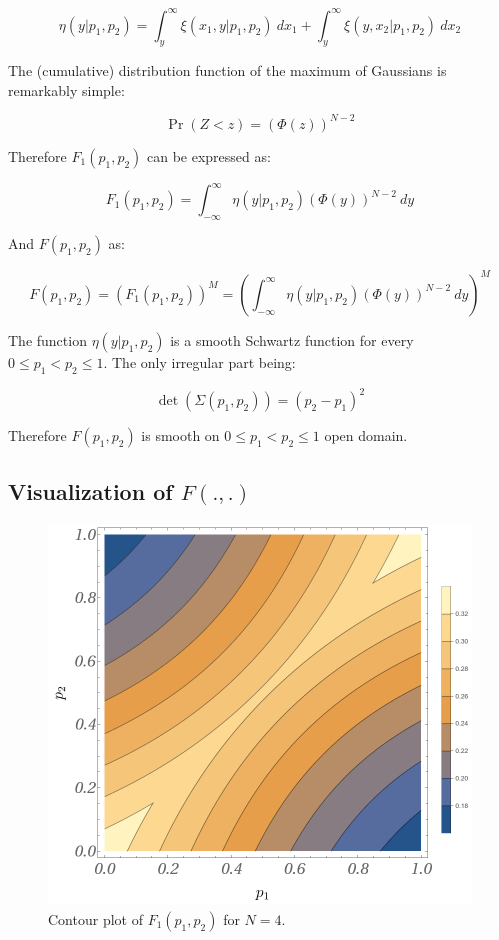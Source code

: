 \documentclass{article}
\theoremstyle{definition}
\begin{document}
\begin{equation}
\label{eq:etaIntegral}
    \eta(y|p_1,p_2) = \int_y^\infty \xi(x_1,y|p_1,p_2) \ d x_1 + \int_y^\infty \xi(y,x_2|p_1,p_2) \ d x_2
\end{equation}

The (cumulative) distribution function of the maximum of Gaussians is remarkably simple: 

\begin{equation}
    \Pr(Z < z) = (\Phi(z))^{N-2}
\end{equation}

Therefore $F_1(p_1,p_2)$ can be expressed as:

\begin{equation}
    F_1(p_1,p_2) = 
    \int_{-\infty}^\infty \eta(y|p_1,p_2) (\Phi(y))^{N-2} \ d y
\end{equation}

And $F(p_1,p_2)$ as:

\begin{equation}
    F(p_1,p_2) = 
    \left ( F_1(p_1,p_2) \right )^M
    =
    \left ( 
    \int_{-\infty}^\infty \eta(y|p_1,p_2) (\Phi(y))^{N-2} \ d y
    \right )^M
\end{equation}

The function $\eta(y|p_1,p_2)$ is a smooth Schwartz function for every $0\le p_1<p_2\le 1$. The only irregular part being:

\begin{equation}
    \det(\Sigma(p_1,p_2)) = (p_2-p_1)^2
\end{equation}

Therefore $F(p_1,p_2)$ is smooth on $0 \le p_1 < p_2 \le 1$ open domain.

\subsection{Visualization of $F(.,.)$}

\begin{figure}[H]
    \centering
    \includegraphics[width=12 cm]{img/F_1_4_CIEP.png}
    \caption{Contour plot of $F_1(p_1,p_2)$ for $N=4$.}
    \label{fig:F_1_4}
\end{figure}
\end{document}
